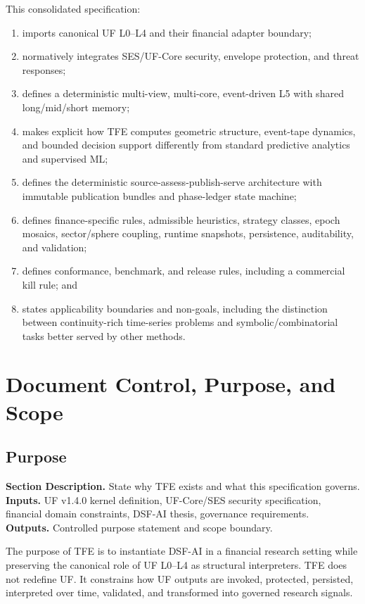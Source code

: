 \documentclass[11pt]{report}
\newcommand{\meta}[3]{\textbf{Section Description.} #1\\
\textbf{Inputs.} #2\\
\textbf{Outputs.} #3\par}
\begin{document}
This consolidated specification:
\begin{enumerate}[leftmargin=1.2cm]
    \item imports canonical UF L0--L4 and their financial adapter boundary;
    \item normatively integrates SES/UF-Core security, envelope protection, and threat responses;
    \item defines a deterministic multi-view, multi-core, event-driven L5 with shared long/mid/short memory;
    \item makes explicit how TFE computes geometric structure, event-tape dynamics, and bounded decision support differently from standard predictive analytics and supervised ML;
    \item defines the deterministic source-assess-publish-serve architecture with immutable publication bundles and phase-ledger state machine;
    \item defines finance-specific rules, admissible heuristics, strategy classes, epoch mosaics, sector/sphere coupling, runtime snapshots, persistence, auditability, and validation;
    \item defines conformance, benchmark, and release rules, including a commercial kill rule; and
    \item states applicability boundaries and non-goals, including the distinction between continuity-rich time-series problems and symbolic/combinatorial tasks better served by other methods.
\end{enumerate}

\chapter{Document Control, Purpose, and Scope}
\section{Purpose}
\meta{State why TFE exists and what this specification governs.}{UF v1.4.0 kernel definition, UF-Core/SES security specification, financial domain constraints, DSF-AI thesis, governance requirements.}{Controlled purpose statement and scope boundary.}

The purpose of TFE is to instantiate DSF-AI in a financial research setting while preserving the canonical role of UF L0--L4 as structural interpreters. TFE does not redefine UF. It constrains how UF outputs are invoked, protected, persisted, interpreted over time, validated, and transformed into governed research signals.
\end{document}
